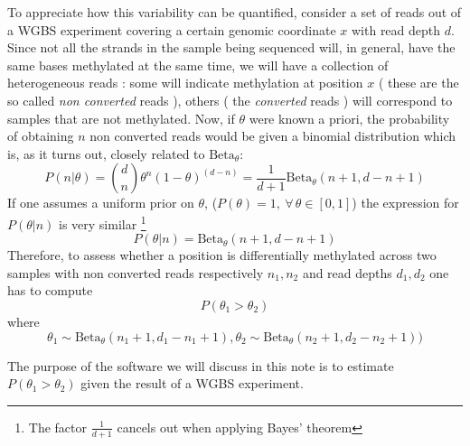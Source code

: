 \documentclass[11pt]{amsart}
\newcommand{\betapdf}{\mbox{Beta}_\theta}
\begin{document}
To appreciate how this variability can be quantified, consider a set of reads out of a WGBS experiment covering a certain genomic coordinate $x$ with read depth $d$. Since not all the strands in the sample being sequenced will, in general,  have the same bases methylated at the same time, we will have a collection of heterogeneous reads : some will indicate methylation at position $x$ ( these are the so called {\em non converted} reads ), others ( the {\em converted} reads ) will correspond to samples that are not methylated. 
Now, if $\theta$ were known a priori, the probability of obtaining $n$ non converted reads would be given a binomial distribution which is, as it turns out, closely related to $\betapdf$:
\[P(n|\theta)={d \choose n}\theta^n ({1-\theta})^{(d-n)}=\frac{1}{d+1}\betapdf(n+1,d-n+1)\]
If one assumes a uniform prior on $\theta$, ($P(\theta)=1, \ \forall\, \theta \in [0,1]$) the expression for $P(\theta|n)$ is very similar \footnote{The factor $\frac{1}{d+1}$ cancels out when applying Bayes' theorem}
\[P(\theta|n)=\betapdf(n+1,d-n+1)\]
Therefore, to assess whether a position is differentially methylated across two samples with non converted reads respectively $n_1,n_2$ and read depths $d_1,d_2$ one
has to compute 
\[P(\theta_1>\theta_2) \] where 
\[ \theta_1 \sim \betapdf(n_1+1,d_1-n_1+1) , \theta_2 \sim \betapdf(n_2+1,d_2-n_2+1))\]\label{ineq}

The purpose of the software we will discuss in this note is to estimate $P(\theta_1>\theta_2)$ given the result of a WGBS experiment.

 
\end{document}
